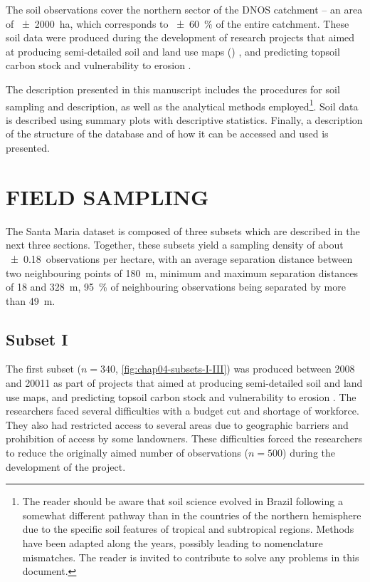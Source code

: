 The soil observations cover the northern sector of the DNOS catchment -- an area of \SI{\pm2000}{\hectare}, 
which corresponds to \SI{\pm60}{\percent} of the entire catchment. These soil data were produced during the 
development of research projects that aimed at producing semi-detailed soil and land use maps () 
\cite{Pedron2005, Miguel2010, SamuelRosaEtAl2011a, MiguelEtAl2012}, and predicting topsoil carbon stock and 
vulnerability to erosion \cite{Samuel-Rosa2009, MouraBueno2012, Miguel2013}.

\def\foottropics{\footnote{The reader should be aware that soil science evolved in Brazil following a somewhat 
different pathway than in the countries of the northern hemisphere due to the specific soil features of 
tropical and subtropical regions. Methods have been adapted along the years, possibly leading to nomenclature 
mismatches. The reader is invited to contribute to solve any problems in this document.}}

The description presented in this manuscript includes the procedures for soil sampling and description, as 
well as the analytical methods employed\foottropics{}. Soil data is described using summary plots with 
descriptive statistics. Finally, a description of the structure of the database and of how it can be accessed 
and used is presented. 

\section{FIELD SAMPLING}
\label{sec:chap04-sampling}

The Santa Maria dataset is composed of three subsets which are described in the next three sections. Together, 
these subsets yield a sampling density of about \num{\pm0.18}~observations per hectare, with an average 
separation distance between two neighbouring points of \SI{180}{\metre}, minimum and maximum separation 
distances of \num{18} and \SI{328}{\metre}, \SI{95}{\percent} of neighbouring observations being separated by 
more than \SI{49}{\metre}.

\subsection{Subset I}

The first subset ($n = 340$, \autoref{fig:chap04-subsets-I-III}) was produced between 2008 and 20011 as part 
of projects that aimed at producing semi-detailed soil and land use maps, and predicting topsoil carbon stock 
and vulnerability to erosion \cite{Samuel-Rosa2009, SamuelRosaEtAl2011a, MiguelEtAl2012, Moura-BuenoEtAl2012, 
Samuel-RosaEtAl2013}. The researchers faced several difficulties with a budget cut and shortage of workforce. 
They also had restricted access to several areas due to geographic barriers and prohibition of access by some 
landowners. These difficulties forced the researchers to reduce the originally aimed number of observations 
($n = 500$) during the development of the project.

